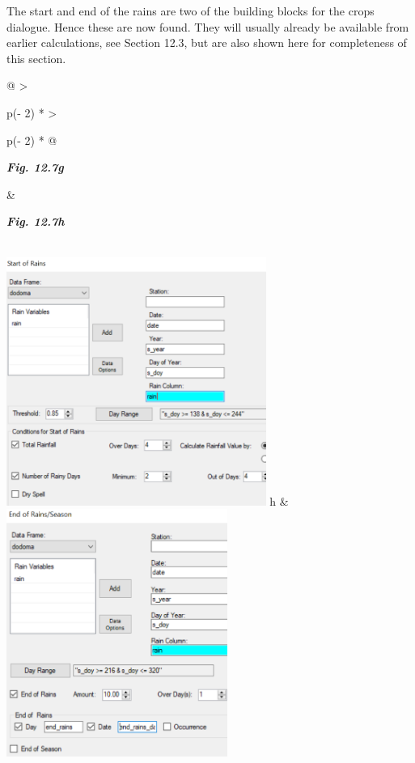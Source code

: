 \documentclass[
  letterpaper,
  DIV=11,
  numbers=noendperiod]{scrreprt}
\begin{document}
The start and end of the rains are two of the building blocks for the
crops dialogue. Hence these are now found. They will usually already be
available from earlier calculations, see Section 12.3, but are also
shown here for completeness of this section.

\begin{longtable}[]{@{}
  >{\raggedright\arraybackslash}p{(\columnwidth - 2\tabcolsep) * }
  >{\raggedright\arraybackslash}p{(\columnwidth - 2\tabcolsep) * }@{}}
\toprule\noalign{}
\begin{minipage}[b]{\linewidth}\raggedright
\textbf{\emph{Fig. 12.7g}}
\end{minipage} & \begin{minipage}[b]{\linewidth}\raggedright
\textbf{\emph{Fig. 12.7h}}
\end{minipage} \\
\midrule\noalign{}
\endhead
\bottomrule\noalign{}
\endlastfoot
\includegraphics[width=3.33995in,height=3.19843in]{figures/Fig12.7g.png}
h &
\includegraphics[width=2.84554in,height=\textheight]{figures/Fig12.7h.png} \\
\end{longtable}
\end{document}
